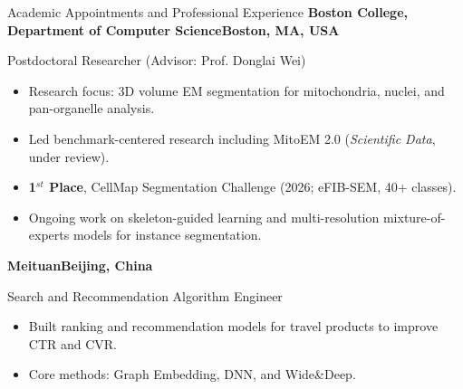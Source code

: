 \begin{rubric}{Academic Appointments and Professional Experience}
%
	\textbf{Boston College, Department of Computer Science}\hfill \textbf{Boston, MA, USA} \par
        Postdoctoral Researcher (Advisor: Prof. Donglai Wei)
 \begin{itemize}
     \item Research focus: 3D volume EM segmentation for mitochondria, nuclei, and pan-organelle analysis.
     \item Led benchmark-centered research including MitoEM 2.0 (\textit{Scientific Data}, under review).
     \item \textbf{1$^{st}$ Place}, CellMap Segmentation Challenge (2026; eFIB-SEM, 40+ classes).
     \item Ongoing work on skeleton-guided learning and multi-resolution mixture-of-experts models for instance segmentation.
 \end{itemize}

%
	\textbf{Meituan}\hfill \textbf{Beijing, China} \par
        Search and Recommendation Algorithm Engineer
 \begin{itemize}
     \item Built ranking and recommendation models for travel products to improve CTR and CVR.
     \item Core methods: Graph Embedding, DNN, and Wide\&Deep.
 \end{itemize}

%
%
%
\end{rubric}

